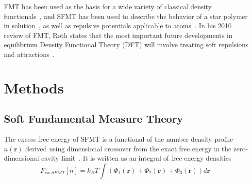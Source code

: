 \documentclass[letterpaper,twocolumn,amsmath,amssymb,prb]{revtex4-1}
\newcommand{\rr}{\textbf{r}}
\newcommand\davidsays[1]{{\bf \color{blue}D: #1}}
\begin{document}
FMT has been used as the
basis for a wide variety of classical density
functionals~\cite{cuesta1997dimensional, hansen2009fundamental,
  marechal2013density, hughes2013classical, krebs2014improved}, and
SFMT has been used to describe the behavior of a star polymer in
solution~\cite{schmidt2000density, groh2001density, kim2001adsorption,
  sweatman2002fundamental}, as well as repulsive potentials applicable
to atoms~\cite{schmidt2000fluid, sweatman2002fundamental}.
In his 2010 review of FMT, Roth states that the most important future
developments in equilibrium Density Functional Theory (DFT) will involve treating soft repulsions
and attractions~\cite{roth2010fundamental}.

\section{Methods}

\subsection{Soft Fundamental Measure Theory}

The excess free energy of SFMT is a functional of the number density 
profile $n(\textbf{r})$ derived using dimensional crossover from the exact 
free energy in the 
zero-dimensional cavity limit~\cite{schmidt1999density}.
It is written as an integral of free energy densities
\begin{equation}
F_\textit{ex-SFMT}[n] = k_B T \int \left(\Phi_1(\rr) + \Phi_2(\rr) +
\Phi_3(\rr)\right) d\rr \; \label{eq:sfmt-excess-free}
\end{equation}

\end{document}
